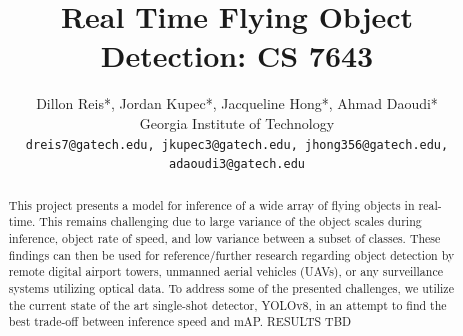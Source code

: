 \documentclass[10pt,twocolumn,letterpaper]{article}
\begin{document}
\title{Real Time Flying Object Detection: CS 7643}

\author{Dillon Reis*, Jordan Kupec*, Jacqueline Hong*, Ahmad Daoudi*\\
Georgia Institute of Technology\\
{\tt\small dreis7@gatech.edu, jkupec3@gatech.edu, jhong356@gatech.edu, adaoudi3@gatech.edu}
}

\maketitle

\begin{abstract}
   This project presents a model for inference of a wide array of flying objects in real-time. 
   This remains challenging due to large variance of the object scales during inference, object rate of speed, 
   and low variance between a subset of classes. These findings can then be used for reference/further research 
   regarding object detection by remote digital airport towers, unmanned aerial vehicles (UAVs), or any surveillance 
   systems utilizing optical data. To address some of the presented challenges, we utilize the current state of the art 
   single-shot detector, YOLOv8, in an attempt to find the best trade-off between inference speed and mAP. RESULTS TBD
\end{abstract}

\end{document}
